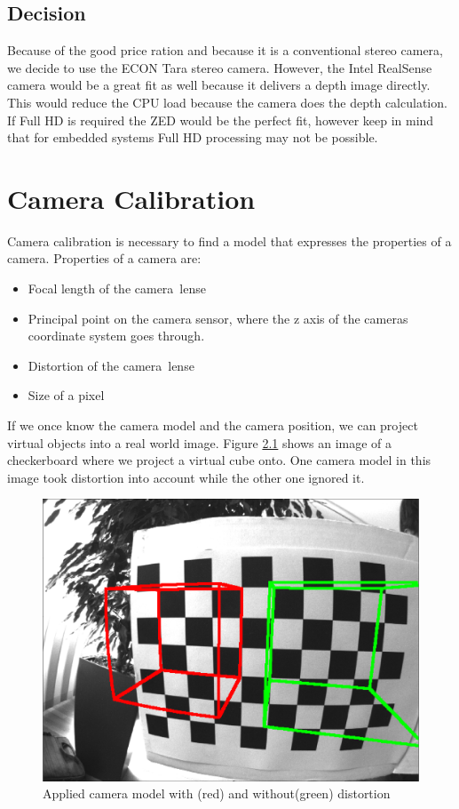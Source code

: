 \documentclass[11pt,a4paper,titlepage,oneside]{report}
\begin{document}
\section{Decision}

Because of the good price ration and because it is a conventional stereo camera, we decide to use the ECON Tara stereo camera. However, the Intel RealSense camera would be a great fit as well because it delivers a depth image directly. This would reduce the CPU load because the camera does the depth calculation. If Full HD is required the ZED would be the perfect fit, however keep in mind that for embedded systems Full HD processing may not be possible.

\chapter{Camera Calibration}

Camera calibration is necessary to find a model that expresses the properties of a camera. Properties of a camera are:

\begin{itemize}
	\item Focal length of the camera lense
	\item Principal point on the camera sensor, where the z axis of the cameras coordinate system goes through.
	\item Distortion of the camera lense
	\item Size of a pixel
\end{itemize}

If we once know the camera model and the camera position, we can project virtual objects into a real world image. Figure \ref{fig:model} shows an image of a checkerboard where we project a virtual cube onto. One camera model in this image took distortion into account while the other one ignored it.
\begin{figure}[H]
  \begin{center}
		\includegraphics[width=1.0\textwidth]{img/model.png}
  \end{center}
	\caption{Applied camera model with (red) and without(green) distortion}\label{fig:model}
\end{figure}
\end{document}
